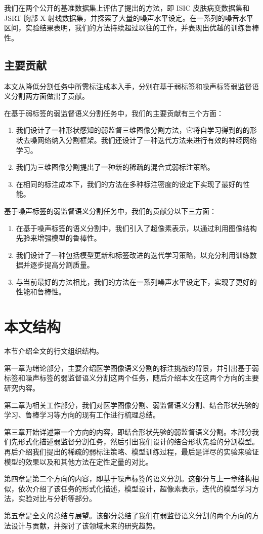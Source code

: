 我们在两个公开的基准数据集上评估了提出的方法，即 ISIC 皮肤病变数据集\citep{Gutman2018SkinLA}和 JSRT 胸部 X 射线数据集\citep{Ginneken2006SegmentationOA,Shiraishi2000DevelopmentOA}，并探索了大量的噪声水平设定。在一系列的噪音水平区间，实验结果表明，我们的方法持续超过以往的工作，并表现出优越的训练鲁棒性。

\subsection{主要贡献}
本文从降低分割任务中所需标注成本入手，分别在基于弱标签和噪声标签弱监督语义分割两方面做出了贡献。

在基于弱标签的弱监督语义分割任务中，我们的主要贡献有三个方面：
\begin{enumerate}
\item 我们设计了一种形状感知的弱监督三维图像分割方法，它将自学习得到的的形状去噪网络纳入分割框架。我们还设计了一种迭代方法来进行有效的神经网络学习。
\item 我们为三维图像分割提出了一种新的稀疏的混合式弱标注策略。
\item 在相同的标注成本下，我们的方法在多种标注密度的设定下实现了最好的性能。
\end{enumerate}


基于噪声标签的弱监督语义分割任务中，我们的贡献分以下三方面：
\begin{enumerate}
    \item 在基于噪声标签的语义分割中，我们引入了超像素表示，以通过利用图像结构先验来增强模型的鲁棒性。
    \item 我们设计了一种包括模型更新和标签改进的迭代学习策略，以充分利用训练数据并逐步提高分割质量。
    \item 与当前最好的方法相比，我们的方法在一系列噪声水平设定下，实现了更好的性能和鲁棒性。
\end{enumerate}

\section{本文结构}
本节介绍全文的行文组织结构。

第一章为绪论部分，主要介绍医学图像语义分割的标注挑战的背景，并引出基于弱标签和噪声标签的弱监督语义分割这两个任务，随后介绍本文在这两个方向的主要研究内容。

第二章为相关工作部分，我们对医学图像分割、弱监督语义分割、结合形状先验的学习、鲁棒学习等方向的现有工作进行梳理总结。

第三章开始详述第一个方向的内容，即结合形状先验的弱监督语义分割。本部分我们先形式化描述弱监督分割任务，然后引出我们设计的结合形状先验的分割模型。再后介绍我们提出的稀疏的弱标注策略、模型训练过程，最后是详尽的实验来验证模型的效果以及和其他方法在定性定量的对比。

第四章是第二个方向的内容，即基于噪声标签的语义分割。这部分与上一章结构相似，依次介绍了该任务的形式化描述，模型设计，超像素表示，迭代的模型学习方法，实验对比与分析等部分。

第五章是全文的总结与展望。该部分总结了我们在弱监督语义分割的两个方向的方法设计与贡献，并探讨了该领域未来的研究趋势。